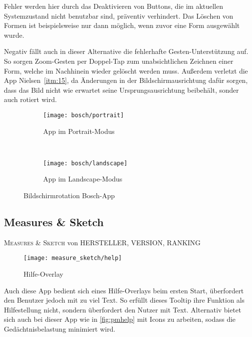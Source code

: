 Fehler werden hier durch das Deaktivieren von Buttons, die im aktuellen Systemzustand nicht benutzbar sind, präventiv verhindert. Das Löschen von Formen ist beispielsweise nur dann möglich, wenn zuvor eine Form ausgewählt wurde.

Negativ fällt auch in dieser Alternative die fehlerhafte Gesten-Unterstützung auf. So sorgen Zoom-Gesten per Doppel-Tap zum unabsichtlichen Zeichnen einer Form, welche im Nachhinein wieder gelöscht werden muss. Außerdem verletzt die App Nielsen~\ref{itm:15}, da Änderungen in der Bildschirmausrichtung dafür sorgen, dass das Bild nicht wie erwartet seine Ursprungsausrichtung beibehält, sonder auch rotiert wird. 

\begin{figure}[h]
	\begin{subfigure}[b]{0.5\textwidth}
		\texttt{[image: bosch/portrait]}
		\caption{App im Portrait-Modus}
		\label{fig:bportait}	
	\end{subfigure}
	~
	\begin{subfigure}[b]{0.5\textwidth}
		\texttt{[image: bosch/landscape]}
		\caption{App im Landscape-Modus}
		\label{fig:blandscape}	
	\end{subfigure}
	\caption{Bildschirmrotation Bosch-App}
	\label{fig:borientation}
\end{figure}

\subsection{Measures \& Sketch}

\textsc{Measures \& Sketch} von HERSTELLER, VERSION, RANKING \\

\begin{wrapfigure}{R}{0.4\textwidth}
	\texttt{[image: measure\_sketch/help]}
	\caption{Hilfe-Overlay}
	\label{fig:mshelp}
\end{wrapfigure}

Auch diese App bedient sich eines Hilfe-Overlays beim ersten Start, überfordert den Benutzer jedoch mit zu viel Text. So erfüllt dieses Tooltip ihre Funktion als Hilfestellung nicht, sondern überfordert den Nutzer mit Text. Alternativ bietet sich auch bei dieser App wie in \autoref{fig:pmhelp} mit Icons zu arbeiten, sodass die Gedächtnisbelastung minimiert wird. \\

